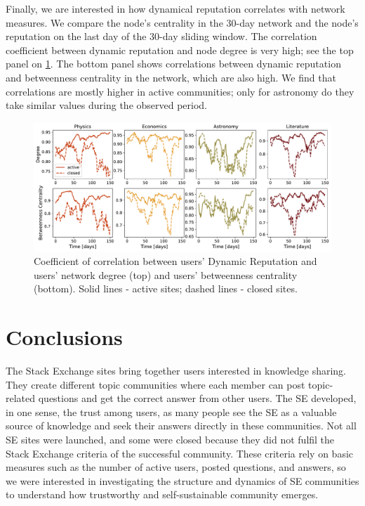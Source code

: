 Finally, we are interested in how dynamical reputation correlates with network measures. We compare the node’s centrality in the 30-day network and the node’s reputation on the last day of the 30-day sliding window. The correlation coefficient between dynamic reputation and node degree is very high; see the top panel on \ref{fig:dyn_rep_centrality}. The bottom panel shows correlations between dynamic reputation and betweenness centrality in the network, which are also high. We find that correlations are mostly higher in active communities; only for astronomy do they take similar values during the observed period. 

\begin{figure}[h]
	\centering
	\includegraphics[width=\linewidth]{figures/stackexchange/correlations.pdf}
	\caption[Coefficient correlation between ]{Coefficient of correlation between users’ Dynamic Reputation and users’ network degree (top) and users’ betweenness centrality (bottom). Solid lines - active sites; dashed lines - closed sites.}
	\label{fig:dyn_rep_centrality}
\end{figure}

\section{Conclusions}

The Stack Exchange sites bring together users interested in knowledge sharing. They create different topic communities where each member can post topic-related questions and get the correct answer from other users. The SE developed, in one sense, the trust among users, as many people see the SE as a valuable source of knowledge and seek their answers directly in these communities. Not all SE sites were launched, and some were closed because they did not fulfil the Stack Exchange criteria of the successful community. These criteria rely on basic measures such as the number of active users, posted questions, and answers, so we were interested in investigating the structure and dynamics of SE communities to understand how trustworthy and self-sustainable community emerges. 

